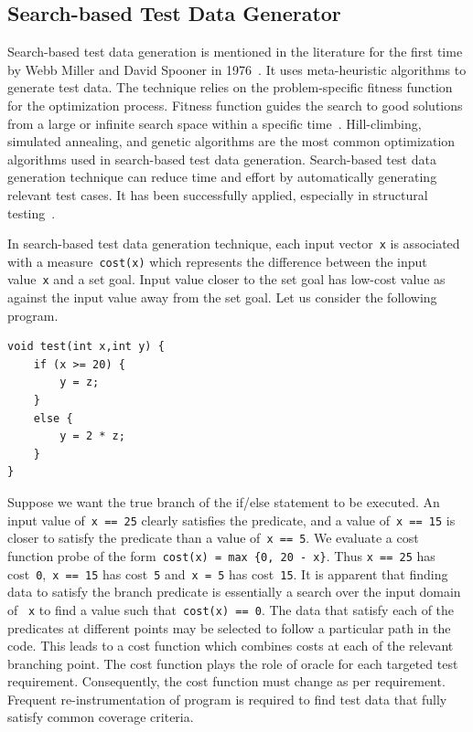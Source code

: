 
\subsection{Search-based Test Data Generator} \label{sec:search_based_2}
Search-based test data generation is mentioned in the literature for the first time by Webb Miller and David Spooner in 1976~\cite{miller1976automatic}. It uses meta-heuristic algorithms to generate test data. The technique relies on the problem-specific fitness function for the optimization process. Fitness function guides the search to good solutions from a large or infinite search space within a specific time~\cite{mcminn2011search}. Hill-climbing, simulated annealing, and genetic algorithms are the most common optimization algorithms used in search-based test data generation. Search-based test data generation technique can reduce time and effort by automatically generating relevant test cases. It has been successfully applied, especially in structural testing~\cite{mcminn2011search, jones1996automatic}.

In search-based test data generation technique, each input vector~\verb+x+ is associated with a measure~\verb+cost(x)+ which represents the difference between the input value~\verb+x+ and a set goal. Input value closer to the set goal has low-cost value as against the input value away from the set goal. 
Let us consider the following program.
\bigskip
\bigskip

\begin{lstlisting}
void test(int x,int y) {
	if (x >= 20) {
		y = z; 
	}
	else {
		y = 2 * z;
	}
}
\end{lstlisting}
\bigskip

Suppose we want the true branch of the if/else statement to be executed. An input value of~\verb+x == 25+ clearly satisfies the predicate, and a value of~\verb+x == 15+ is closer to satisfy the predicate than a value of~\verb+x == 5+. We evaluate a cost function probe of the form~\verb+cost(x) = max {0, 20 - x}+. Thus \verb+x == 25+ has cost~\verb+0+,~\verb+x == 15+ has cost~\verb+5+ and~\verb+x = 5+ has cost~\verb+15+. It is apparent that finding data to satisfy the branch predicate is essentially a search over the input domain of ~\verb+x+ to find a value such that~\verb+cost(x) == 0+. The data that satisfy each of the predicates at different points may be selected to follow a particular path in the code. This leads to a cost function which combines costs at each of the relevant branching point. The cost function plays the role of oracle for each targeted test requirement. Consequently, the cost function must change as per requirement. Frequent re-instrumentation of program is required to find test data that fully satisfy common coverage criteria. 



